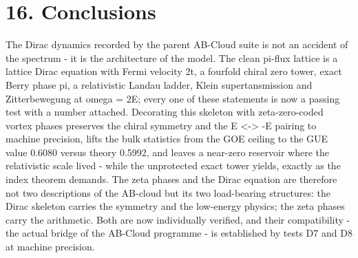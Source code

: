 \documentclass[11pt,a4paper]{article}
\begin{document}
\section{16. Conclusions}
The Dirac dynamics recorded by the parent AB-Cloud suite is not an accident of the spectrum - it is the architecture of the model. The clean pi-flux lattice is a lattice Dirac equation with Fermi velocity 2t, a fourfold chiral zero tower, exact Berry phase pi, a relativistic Landau ladder, Klein supertansmission and Zitterbewegung at omega = 2E; every one of these statements is now a passing test with a number attached. Decorating this skeleton with zeta-zero-coded vortex phases preserves the chiral symmetry and the E <-> -E pairing to machine precision, lifts the bulk statistics from the GOE ceiling to the GUE value 0.6080 versus theory 0.5992, and leaves a near-zero reservoir where the relativistic scale lived - while the unprotected exact tower yields, exactly as the index theorem demands. The zeta phases and the Dirac equation are therefore not two descriptions of the AB-cloud but its two load-bearing structures: the Dirac skeleton carries the symmetry and the low-energy physics; the zeta phases carry the arithmetic. Both are now individually verified, and their compatibility - the actual bridge of the AB-Cloud programme - is established by tests D7 and D8 at machine precision.
\end{document}
